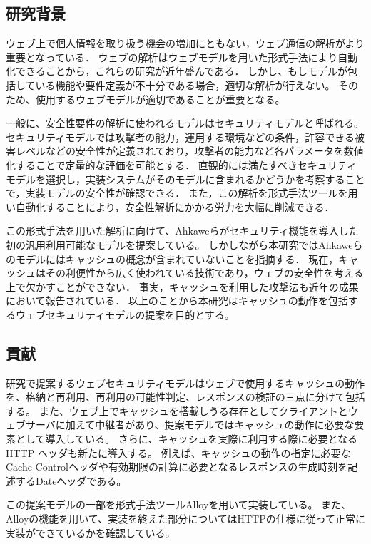 \documentclass{css}
\begin{document}
\subsection{研究背景}
ウェブ上で個人情報を取り扱う機会の増加にともない，ウェブ通信の解析がより重要となっている．
ウェブの解析はウェブモデルを用いた形式手法により自動化できることから，これらの研究が近年盛んである．
しかし、もしモデルが包括している機能や要件定義が不十分である場合，適切な解析が行えない。
そのため、使用するウェブモデルが適切であることが重要となる。

一般に、安全性要件の解析に使われるモデルはセキュリティモデルと呼ばれる。
セキュリティモデルでは攻撃者の能力，運用する環境などの条件，許容できる被害レベルなどの安全性が定義されており，攻撃者の能力など各パラメータを数値化することで定量的な評価を可能とする．
直観的には満たすべきセキュリティモデルを選択し，実装システムがそのモデルに含まれるかどうかを考察することで，実装モデルの安全性が確認できる．
また，この解析を形式手法ツールを用い自動化することにより，安全性解析にかかる労力を大幅に削減できる．

この形式手法を用いた解析に向けて、Ahkaweら\cite{webmodel}がセキュリティ機能を導入した初の汎用利用可能なモデルを提案している。
しかしながら本研究ではAhkaweらのモデルにはキャッシュの概念が含まれていないことを指摘する．
現在，キャッシュはその利便性から広く使われている技術であり，ウェブの安全性を考える上で欠かすことができない．
事実，キャッシュを利用した攻撃法も近年の成果において報告されている\cite{bcpattack}．
以上のことから本研究はキャッシュの動作を包括するウェブセキュリティモデルの提案を目的とする。

\subsection{貢献}
研究で提案するウェブセキュリティモデルはウェブで使用するキャッシュの動作を、格納と再利用、再利用の可能性判定、レスポンスの検証の三点に分けて包括する。
また、ウェブ上でキャッシュを搭載しうる存在としてクライアントとウェブサーバに加えて中継者があり、提案モデルではキャッシュの動作に必要な要素として導入している。
さらに、キャッシュを実際に利用する際に必要となるHTTP ヘッダも新たに導入する。
例えば、キャッシュの動作の指定に必要なCache-Controlヘッダや有効期限の計算に必要となるレスポンスの生成時刻を記述するDateヘッダである。

この提案モデルの一部を形式手法ツールAlloyを用いて実装している。
また、Alloyの機能を用いて、実装を終えた部分についてはHTTPの仕様に従って正常に実装ができているかを確認している。
\end{document}
